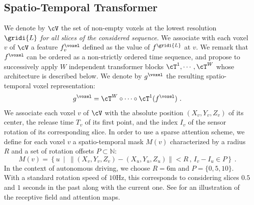 \documentclass[runningheads]{tpls/llncs}
\begin{document}
\subsection{Spatio-Temporal Transformer}
We denote by $\cV$ the set of non-empty voxels at the lowest resolution $\gridi{L}$ \emph{for all slices of the considered sequence}. 
We associate with each voxel $v$ of $\cV$ a feature $f^\voxel_v$ defined as the value of $f^{\gridi{L}}$ at $v$.
We remark that $f^\voxel$ can be ordered as a non-strictly ordered time sequence, and propose to successively apply $W$ independent transformer blocks $\cT^1, \cdots,\cT^W$ whose architecture is described below. We denote by $g^\voxel$ the resulting spatio-temporal voxel representation:
\begin{align}
g^\voxel = \cT^{{W}} \circ \cdots \circ \cT^{{1}}(f^\voxel) ~.
\end{align}
We associate each voxel $v$ of $\cV$ with the absolute position $(X_v, Y_v, Z_v)$ of its center, the release time $T_v$ of its first point, and the index $I_v$ of the sensor rotation of its corresponding slice.
In order to use a sparse attention scheme, we define for each voxel $v$ a spatio-temporal mask $M(v)$ characterized by a radius $R$ and a set of rotation offsets $P \subset \mathbb{N}$:
\begin{equation}
    M(v) = \left\{ u~\middle |~\lVert (X_v,Y_v,Z_v)-(X_u,Y_u,Z_u) \rVert <R \,,\, I_v - I_u \in P\right\}~.
\end{equation}
In the context of autonomous driving, we choose $R=6$m and $P=\{0, 5, 10\}$. With a standard rotation speed of $10$Hz, this corresponds to considering slices $0.5$ and $1$ seconds in the past along with the current one. See  for an illustration of the receptive field and attention maps.
\end{document}
